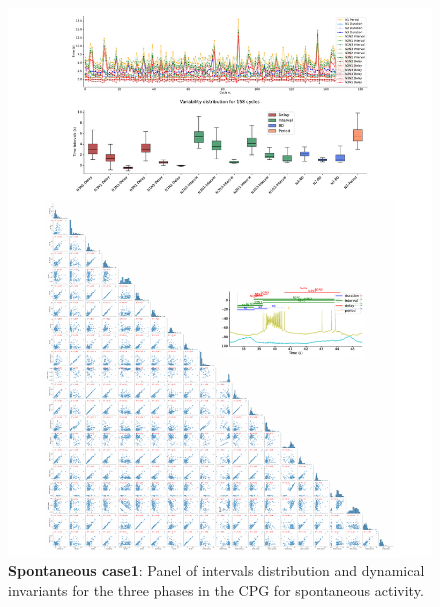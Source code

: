 \begin{figure}[htbp]
	\centering
	\includegraphics[width=1.1\textwidth]{./invariants/data/SUSSEX/prep1/images/3phases/panel_with_pairplot.pdf}
	\caption{\textbf{Spontaneous case1}: Panel of intervals distribution and dynamical invariants for the three phases in the CPG for spontaneous activity.}
	\label{fig:prep1 invariants pairplot}
\end{figure}


